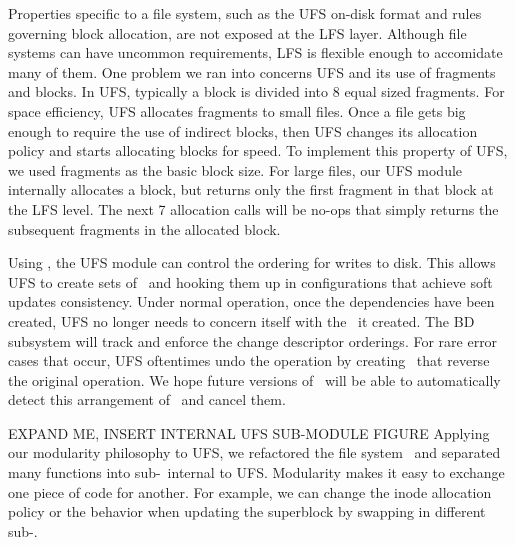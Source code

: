 Properties specific to a file system, such as the UFS on-disk format and rules
governing block allocation, are not exposed at the LFS layer.  Although file
systems can have uncommon requirements, LFS is flexible enough to accomidate
many of them. One problem we ran into concerns UFS and its use of fragments
and blocks. In UFS, typically a block is divided into 8 equal sized fragments.
For space efficiency, UFS allocates fragments to small files. Once a file gets
big enough to require the use of indirect blocks, then UFS changes its
allocation policy and starts allocating blocks for speed. To implement this
property of UFS, we used fragments as the basic block size. For large files,
our UFS module internally allocates a block, but returns only the first
fragment in that block at the LFS level. The next 7 allocation calls will be
no-ops that simply returns the subsequent fragments in the allocated block.

Using \chdescs, the UFS module can control the ordering for writes to disk.
This allows UFS to create sets of \chdescs\ and hooking them up in
configurations that achieve soft updates consistency. Under normal operation,
once the dependencies have been created, UFS no longer needs to concern itself
with the \chdescs\ it created. The BD subsystem will track and enforce the
change descriptor orderings. For rare error cases that occur, UFS oftentimes
undo the operation by creating \chdescs\ that reverse the original operation.
We hope future versions of \Kudos\ will be able to automatically detect this
arrangement of \chdescs\ and cancel them.

EXPAND ME, INSERT INTERNAL UFS SUB-MODULE FIGURE
Applying our modularity philosophy to UFS, we refactored the file system
\module\ and separated many functions into sub-\modules\ internal to UFS.
Modularity makes it easy to exchange one piece of code for another. For
example, we can change the inode allocation policy or the behavior when
updating the superblock by swapping in different sub-\module.


